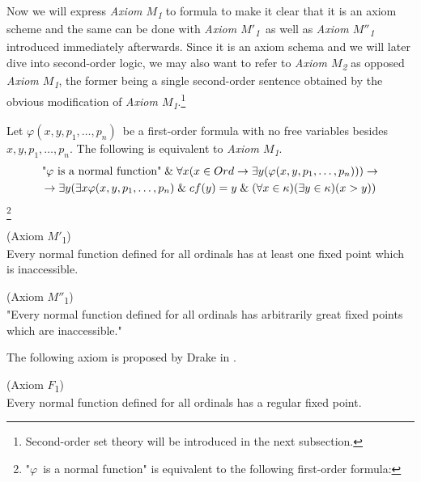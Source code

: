 Now we will express \emph{Axiom $M$\textsubscript{1}} to formula to make it clear that it is an axiom scheme and the same can be done with \emph{Axiom $M'$\textsubscript{1}} as well as \emph{Axiom $M''$\textsubscript{1}} introduced immediately afterwards. Since it is an axiom schema and we will later dive into second-order logic, we may also want to refer to \emph{Axiom $M$\textsubscript{2}} as opposed \emph{Axiom $M$\textsubscript{1}}, the former being a single second-order sentence obtained by the obvious modification of \emph{Axiom $M$\textsubscript{1}}.\footnote{Second-order set theory will be introduced in the next subsection.}

Let $\varphi(x, y, p_1, \ldots, p_n)$ be a first-order formula with no free variables besides $x, y, p_1, \ldots, p_n$. The following is equivalent to \emph{Axiom $M$\textsubscript{1}}.
\begin{equation}
\begin{gathered}
\mbox{"$\varphi$ is a normal function"} \et \forall x (x \in Ord \then \exists y(\varphi(x, y, p_1, \ldots, p_n))) \then\\
\then \exists y (\exists x \varphi(x, y, p_1, \ldots, p_n) \et cf(y) = y \et (\forall x \in \kappa)(\exists y \in \kappa)(x > y))
\end{gathered}
\end{equation}\footnote{"$\varphi$ is a normal function" is equivalent to the following first-order formula: }

\begin{definition}{(Axiom $M'$\textsubscript{1})}\\
Every normal function defined for all ordinals has at least one fixed point which is inaccessible.
\end{definition}

\begin{definition}{(Axiom $M''$\textsubscript{1})}\\
"Every normal function defined for all ordinals has arbitrarily great fixed points which are inaccessible."
\end{definition}

The following axiom is proposed by Drake in \cite{DrakeBook}. 
\begin{definition}{(Axiom $F$\textsubscript{1})}\\
Every normal function defined for all ordinals has a regular fixed point.
\end{definition}


